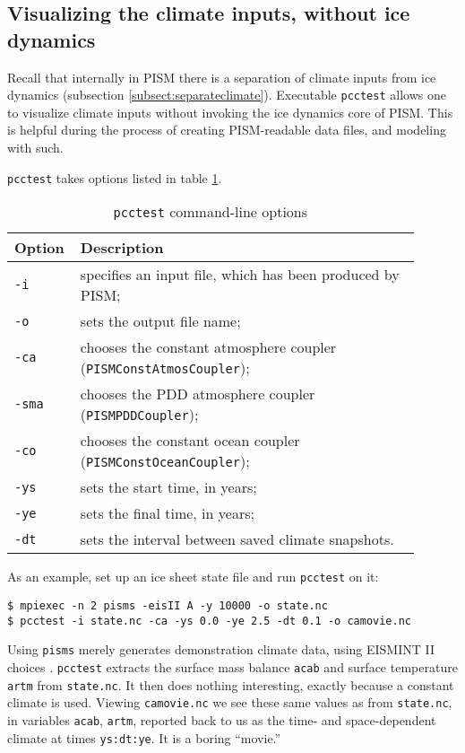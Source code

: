 \subsection{Visualizing the climate inputs, without ice dynamics}\label{subsect:pcctest}  Recall that
internally in PISM there is a separation of climate inputs from ice dynamics
(subsection \ref{subsect:separateclimate}).  Executable \verb|pcctest|
allows one to visualize climate inputs without invoking the ice dynamics core of PISM.
This is helpful during the process of creating PISM-readable data files, and modeling 
with such.

\verb|pcctest| takes options listed in table \ref{tab:pcctest}.

\begin{table}[h]
  \caption{\texttt{pcctest} command-line options}
  \centering
  \begin{tabular}{p{0.1\linewidth}p{0.8\linewidth}}\hline
    \textbf{Option} & \textbf{Description}\\
    \hline
    \texttt{-i} & specifies an input file, which has been produced by PISM;\\
    \texttt{-o} & sets the output file name;\\
    \texttt{-ca} &chooses the constant atmosphere coupler (\verb|PISMConstAtmosCoupler|);\\
    \texttt{-sma} & chooses the PDD atmosphere coupler (\verb|PISMPDDCoupler|);\\
    \texttt{-co} & chooses the constant ocean coupler (\verb|PISMConstOceanCoupler|);\\
    \texttt{-ys} & sets the start time, in years;\\
    \texttt{-ye} & sets the final time, in years;\\
    \texttt{-dt} & sets the interval between saved climate snapshots.\\
    \hline
 \end{tabular}
 \label{tab:pcctest}
\end{table}

\bigskip
As an example, set up an ice sheet state file and run \verb|pcctest| on it:
\begin{verbatim}
$ mpiexec -n 2 pisms -eisII A -y 10000 -o state.nc
$ pcctest -i state.nc -ca -ys 0.0 -ye 2.5 -dt 0.1 -o camovie.nc
\end{verbatim}
Using \verb|pisms| merely generates demonstration climate data, using
EISMINT II choices \cite{EISMINT00}.  \verb|pcctest| extracts the 
surface mass balance \verb|acab| and surface temperature \verb|artm| from \verb|state.nc|.
It then does nothing interesting, exactly because a constant climate
is used.  Viewing \verb|camovie.nc| we see these same values as from \verb|state.nc|,
in variables \verb|acab|, \verb|artm|, reported back to us as the time- and space-dependent
climate at times \verb|ys:dt:ye|.  It is a boring ``movie.''


